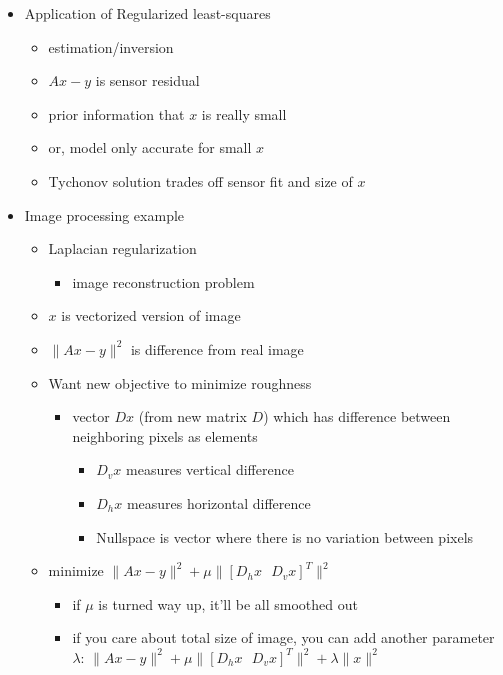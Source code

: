 \documentclass[10pt,letterpaper]{article}
\begin{document}
\begin{itemize}
\item Application of Regularized least-squares

\begin{itemize}
\item estimation/inversion
\item $Ax-y$ is sensor residual
\item prior information that $x$ is really small
\item or, model only accurate for small $x$
\item Tychonov solution trades off sensor fit and size of $x$
\end{itemize}

\item Image processing example

\begin{itemize}
\item Laplacian regularization

\begin{itemize}
\item image reconstruction problem
\end{itemize}

\item $x$ is vectorized version of image
\item $\|A x - y\| ^{2}$ is difference from real image
\item Want new objective to minimize roughness

\begin{itemize}
\item vector $Dx$ (from new matrix $D$) which has difference between neighboring pixels as elements

\begin{itemize}
\item $D_v x$ measures vertical difference
\item $D_h x$ measures horizontal difference
\item Nullspace is vector where there is no variation between pixels
\end{itemize}

\end{itemize}

\item minimize $\|A x-y\| ^{2} + \mu \| [D_h x \text{ } D_v x]^{T} \| ^{2}$

\begin{itemize}
\item if $\mu$ is turned way up, it'll be all smoothed out
\item if you care about total size of image, you can add another parameter $\lambda$: $\|A x-y\| ^{2} + \mu \| [D_h x \text{ } D_v x]^{T} \| ^{2} + \lambda \|x\| ^{2}$
\end{itemize}

\end{itemize}

\end{itemize}
\end{document}
